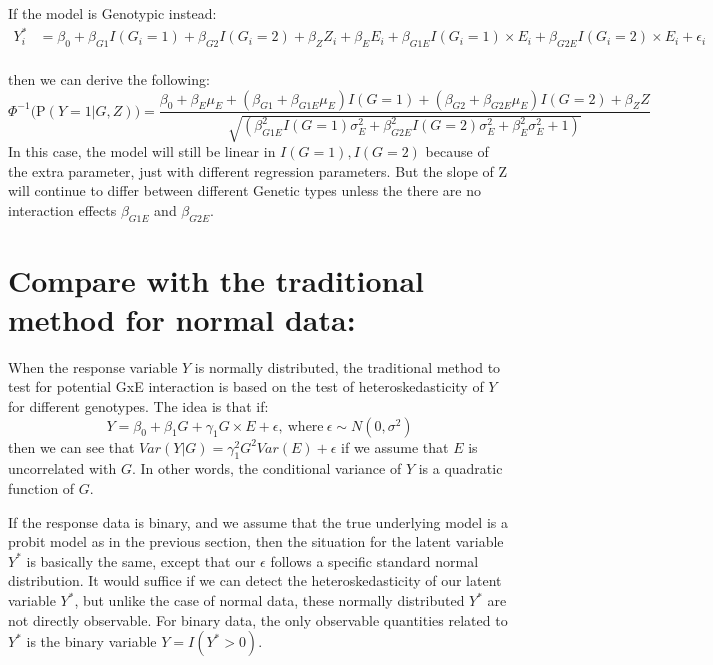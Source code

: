 \documentclass[
]{article}
\begin{document}
If the model is Genotypic instead: \begin{equation}\label{eqn:genointer}
\begin{aligned}
Y_i^* &= \beta_0 + \beta_{G1} I(G_i = 1) + \beta_{G2} I(G_i = 2) + \beta_Z Z_i + \beta_E E_i + \beta_{G1E} I(G_i = 1) \times E_i + \beta_{G2E} I(G_i = 2) \times E_i  + \epsilon_i \\
\end{aligned}
\end{equation}

then we can derive the following:
\[\Phi^{-1} \bigg(\text{P}(Y = 1 | G, Z) \bigg) = \frac{\beta_0+\beta_E \mu_E+(\beta_{G1} + \beta_{G1E} \mu_E)I(G = 1)+(\beta_{G2} + \beta_{G2E} \mu_E)I(G = 2) + \beta_Z Z}{\sqrt{(\beta_{G1E}^2 I(G = 1) \sigma_E^2 +\beta_{G2E}^2 I(G = 2) \sigma_E^2 + \beta_E^2 \sigma_E^2 + 1)}} \]
In this case, the model will still be linear in \(I(G = 1), I(G = 2)\)
because of the extra parameter, just with different regression
parameters. But the slope of Z will continue to differ between different
Genetic types unless the there are no interaction effects
\(\beta_{G1E}\) and \(\beta_{G2E}\).

\hypertarget{compare-with-the-traditional-method-for-normal-data}{%
\section{Compare with the traditional method for normal
data:}\label{compare-with-the-traditional-method-for-normal-data}}

When the response variable \(Y\) is normally distributed, the
traditional method to test for potential GxE interaction is based on the
test of heteroskedasticity of \(Y\) for different genotypes. The idea is
that if:
\[ Y = \beta_0 + \beta_1G + \gamma_1 G\times E+ \epsilon, \ \text{where} \ \epsilon\sim N(0,\sigma^2) \]
then we can see that \(Var(Y|G) = \gamma_1^2G^2Var(E)+\epsilon\) if we
assume that \(E\) is uncorrelated with \(G\). In other words, the
conditional variance of \(Y\) is a quadratic function of \(G\).

If the response data is binary, and we assume that the true underlying
model is a probit model as in the previous section, then the situation
for the latent variable \(Y^*\) is basically the same, except that our
\(\epsilon\) follows a specific standard normal distribution. It would
suffice if we can detect the heteroskedasticity of our latent variable
\(Y^*\), but unlike the case of normal data, these normally distributed
\(Y^*\) are not directly observable. For binary data, the only
observable quantities related to \(Y^*\) is the binary variable
\(Y = I(Y^*>0)\).
\end{document}
